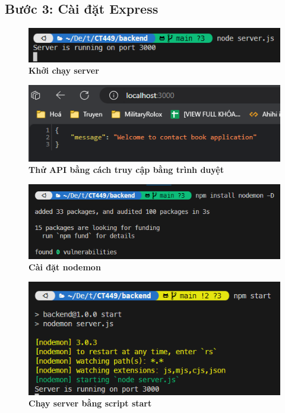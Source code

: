 \subsection*{Bước 3: Cài đặt Express}
\setcounter{subsection}{3}
\setcounter{figure}{0}
\begin{figure}[H]
  \centering
  \includegraphics{images/chapterFirst/8.png}
  \caption{\bfseries Khởi chạy server}
\end{figure}
\begin{figure}[H]
  \centering
  \includegraphics{images/chapterFirst/9.png}
  \caption{\bfseries Thử API bằng cách truy cập bằng trình duyệt}
\end{figure}
\begin{figure}[H]
  \centering
  \includegraphics{images/chapterFirst/10.png}
  \caption{\bfseries Cài đặt nodemon}
\end{figure}
\begin{figure}[H]
  \centering
  \includegraphics{images/chapterFirst/11.png}
  \caption{\bfseries Chạy server bằng script start}
\end{figure}
